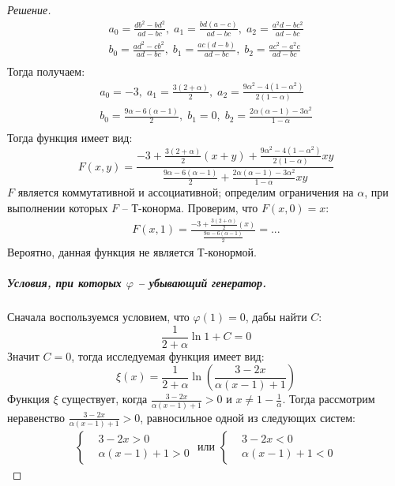 \documentclass[11pt,a4paper,oneside]{article}
\newenvironment{solution}{
	\begin{proof}[Решение]
		\vspace{-8px}
		\setlength{\parskip}{4px}
		\setlength{\parindent}{0px}
	}{
	\end{proof}
}
\begin{document}
\begin{solution}
\begin{gather*}
			a_0 = \frac{db^2 - bd^2}{ad-bc},\;a_1 = \frac{bd(a-c)}{ad-bc},\;a_2 = \frac{a^2d-bc^2}{ad-bc} \\
			b_0 = \frac{ad^2 - cb^2}{ad-bc},\;b_1 = \frac{ac(d-b)}{ad-bc},\;b_2 = \frac{ac^2-a^2c}{ad-bc} \\
		\end{gather*}
		Тогда получаем:
		\begin{gather*}
		a_0 = -3,\;a_1 = \frac{3(2+\alpha)}{2},\;a_2 = \frac{9\alpha^2-4(1-\alpha^2)}{2(1-\alpha)} \\
		b_0 = \frac{9\alpha - 6(\alpha-1)}{2},\;b_1 = 0,\;b_2 = \frac{2\alpha(\alpha-1) - 3\alpha^2}{1-\alpha} \\
		\end{gather*}
		Тогда функция имеет вид:
		\[
			F(x,y) = \frac{-3 + \frac{3(2+\alpha)}{2}(x+y) + \frac{9\alpha^2-4(1-\alpha^2)}{2(1-\alpha)}xy}{\frac{9\alpha - 6(\alpha-1)}{2} + \frac{2\alpha(\alpha-1) - 3\alpha^2}{1-\alpha}xy}
		\]
		$F$ является коммутативной и ассоциативной; определим ограничения на $\alpha$, при выполнении которых $F$ -- Т-конорма.
		\newline
		Проверим, что $F(x,0) = x$:
		\begin{gather*}
			F(x,1) = \frac{-3 + \frac{3(2+\alpha)}{2}(x)}{\frac{9\alpha - 6(\alpha-1)}{2}} = ...
		\end{gather*}
		Вероятно, данная функция не является Т-конормой.
		\subparagraph{Условия, при которых $\varphi$ -- убывающий генератор.}
		Сначала воспользуемся условием, что $ \varphi(1) = 0 $, дабы найти $C$:
		\[
			\frac{1}{2+\alpha}\ln 1 + C = 0
		\]
		Значит $ C = 0$, тогда исследуемая функция имеет вид:
		\[
			\xi(x) = \frac{1}{2+\alpha}\ln \left( \frac{3-2x}{\alpha(x-1) + 1} \right)
		\]
		Функция $\xi$ существует, когда $ \frac{3-2x}{\alpha(x-1) + 1} > 0 $ и $ x \neq 1 - \frac{1}{\alpha} $. Тогда рассмотрим неравенство $ \frac{3-2x}{\alpha(x-1) + 1} > 0 $, равносильное одной из следующих систем:
		 \begin{gather*}
		 \left\{
		 \begin{aligned}
		 &3-2x > 0 \\
		 & \alpha(x-1) + 1 > 0
		 \end{aligned}
		 \right.
		 \text{  или  }
		 \left\{
		 \begin{aligned}
		 &3-2x < 0 \\
		 & \alpha(x-1) + 1 < 0
		 \end{aligned}
		 \right.
		 \end{gather*}

\end{solution}
\end{document}
